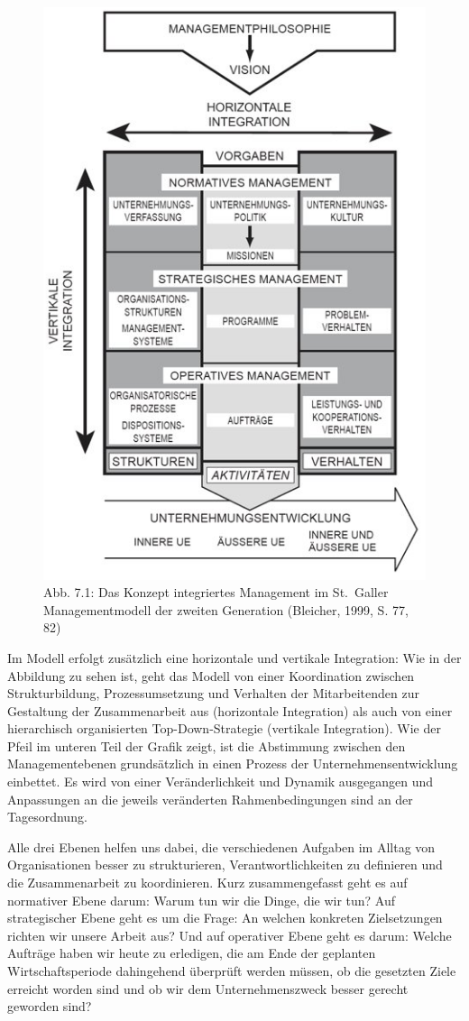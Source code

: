 \documentclass[
  letterpaper,
]{book}
\begin{document}
\begin{figure}

\includegraphics[width=0.75\linewidth,height=\textheight,keepaspectratio]{images/figure71.png} \hfill{}

\caption{Abb. 7.1: Das Konzept integriertes Management im St.~Galler
Managementmodell der zweiten Generation (Bleicher, 1999, S. 77, 82)}

\end{figure}%

Im Modell erfolgt zusätzlich eine horizontale und vertikale Integration:
Wie in der Abbildung zu sehen ist, geht das Modell von einer
Koordination zwischen Strukturbildung, Prozessumsetzung und Verhalten
der Mitarbeitenden zur Gestaltung der Zusammenarbeit aus (horizontale
Integration) als auch von einer hierarchisch organisierten
Top-Down-Strategie (vertikale Integration). Wie der Pfeil im unteren
Teil der Grafik zeigt, ist die Abstimmung zwischen den Managementebenen
grundsätzlich in einen Prozess der Unternehmensentwicklung einbettet. Es
wird von einer Veränderlichkeit und Dynamik ausgegangen und Anpassungen
an die jeweils veränderten Rahmenbedingungen sind an der Tagesordnung.

Alle drei Ebenen helfen uns dabei, die verschiedenen Aufgaben im Alltag
von Organisationen besser zu strukturieren, Verantwortlichkeiten zu
definieren und die Zusammenarbeit zu koordinieren. Kurz zusammengefasst
geht es auf normativer Ebene darum: Warum tun wir die Dinge, die wir
tun? Auf strategischer Ebene geht es um die Frage: An welchen konkreten
Zielsetzungen richten wir unsere Arbeit aus? Und auf operativer Ebene
geht es darum: Welche Aufträge haben wir heute zu erledigen, die am Ende
der geplanten Wirtschaftsperiode dahingehend überprüft werden müssen, ob
die gesetzten Ziele erreicht worden sind und ob wir dem
Unternehmenszweck besser gerecht geworden sind?
\end{document}
